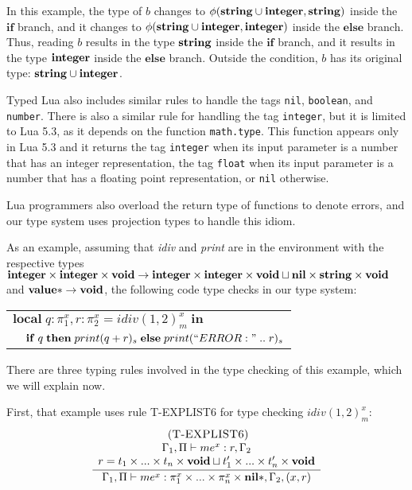 In this example, the type of $b$ changes to
$\phi(\mathbf{string} \cup \mathbf{integer}, \mathbf{string})$ inside the $\mathbf{if}$ branch, and
it changes to $\phi(\mathbf{string} \cup \mathbf{integer}, \mathbf{integer})$ inside the $\mathbf{else}$ branch.
Thus, reading $b$ results in the type $\mathbf{string}$ inside the $\mathbf{if}$ branch,
and it results in the type $\mathbf{integer}$ inside the $\mathbf{else}$ branch.
Outside the condition, $b$ has its original type: $\mathbf{string} \cup \mathbf{integer}$.

Typed Lua also includes similar rules to handle the tags \texttt{nil},
\texttt{boolean}, and \texttt{number}.
There is also a similar rule for handling the tag \texttt{integer}, but
it is limited to Lua 5.3, as it depends on the function \texttt{math.type}.
This function appears only in Lua 5.3 and it returns the tag \texttt{integer}
when its input parameter is a number that has an integer representation,
the tag \texttt{float} when its input parameter is a number that has a
floating point representation, or \texttt{nil} otherwise.

Lua programmers also overload the return type of functions to denote errors,
and our type system uses projection types to handle this idiom.

As an example, assuming that \emph{idiv} and \emph{print} are in the
environment with the respective types
$\mathbf{integer} \times \mathbf{integer} \times \mathbf{void} \rightarrow \mathbf{integer} \times \mathbf{integer} \times \mathbf{void} \sqcup \mathbf{nil} \times \mathbf{string} \times \mathbf{void}$
and
$\mathbf{value}{*} \rightarrow \mathbf{void}$,
the following code type checks in our type system:
\begin{center}
\begin{tabular}{ll}
\multicolumn{2}{l}{$\mathbf{local} \; q:\pi_{1}^{x}, r:\pi_{2}^{x} = idiv(1, 2)_{m}^{x} \; \mathbf{in}$}\\
& \multicolumn{1}{l}{$\mathbf{if} \; q \; \mathbf{then} \; print(q + r)_{s} \; \mathbf{else} \; print(``ERROR: " \; .. \; r)_{s}$}
\end{tabular}
\end{center}

There are three typing rules involved in the type checking of this example,
which we will explain now.

First, that example uses rule \textsc{T-EXPLIST6} for type checking
$idiv(1, 2)_{m}^{x}$:
\[
\begin{array}{c}
\; (\textsc{T-EXPLIST6})\\
\dfrac{\begin{array}{c}
       \Gamma_{1}, \Pi \vdash me^{x}:r, \Gamma_{2}\\
       r = t_{1} \times ... \times t_{n} \times \mathbf{void} \sqcup t_{1}' \times ... \times t_{n}' \times \mathbf{void}
       \end{array}}
      {\Gamma_{1}, \Pi \vdash me^{x}:\pi_{1}^{x} \times ... \times \pi_{n}^{x} \times \mathbf{nil}{*}, \Gamma_{2}, (x,r)}
\end{array}
\]

